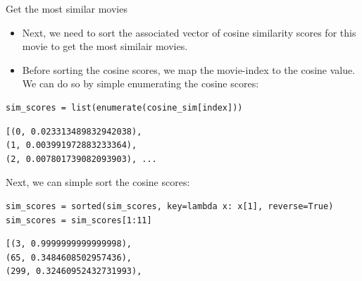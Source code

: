 \documentclass[handout]{beamer}
\begin{document}
\begin{frame}[fragile]{Get the most similar movies}
\begin{itemize}
	\item<1->Next, we need to sort the associated vector of cosine similarity scores for this movie to get the most similair movies.
	\item<2->Before sorting the cosine scores, we map the movie-index to the cosine value. We can do so by simple enumerating the cosine scores:
\end{itemize}
\pause
\begin{verbatim}
sim_scores = list(enumerate(cosine_sim[index])) 
\end{verbatim}
\pause
\begin{verbatim}
[(0, 0.023313489832942038),
(1, 0.003991972883233364),
(2, 0.007801739082093903), ...
\end{verbatim}
\pause
Next, we can simple sort the cosine scores:
\begin{verbatim}
sim_scores = sorted(sim_scores, key=lambda x: x[1], reverse=True)
sim_scores = sim_scores[1:11]
\end{verbatim}
\pause
\begin{verbatim}
[(3, 0.9999999999999998),
(65, 0.3484608502957436),
(299, 0.32460952432731993),
\end{verbatim}
\end{frame}
\end{document}

